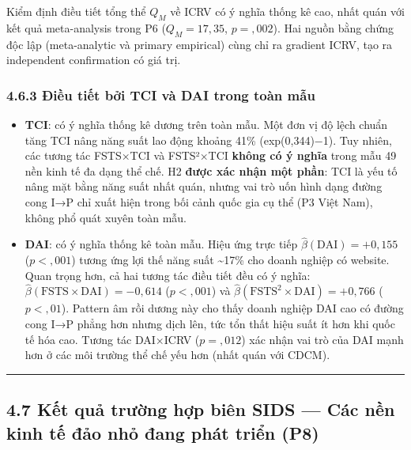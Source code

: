 \documentclass[12pt,a4paper]{article}
\providecommand{\tightlist}{\setlength{\itemsep}{0pt}\setlength{\parskip}{0pt}}
\begin{document}
Kiểm định điều tiết tổng thể \(Q_M\) về ICRV có ý nghĩa thống kê cao,
nhất quán với kết quả meta-analysis trong P6 (\(Q_M = 17{,}35\),
\(p = {,}002\)). Hai nguồn bằng chứng độc lập (meta-analytic và primary
empirical) cùng chỉ ra gradient ICRV, tạo ra independent confirmation có
giá trị.

\hypertarget{463-ux111iux1ec1u-tiux1ebft-bux1edfi-tci-vuxe0-dai-trong-touxe0n-mux1eabu}{%
\subsubsection{4.6.3 Điều tiết bởi TCI và DAI trong toàn
mẫu}\label{463-ux111iux1ec1u-tiux1ebft-bux1edfi-tci-vuxe0-dai-trong-touxe0n-mux1eabu}}

\begin{itemize}
\tightlist
\item
  \textbf{TCI}: có ý nghĩa thống kê dương trên toàn mẫu. Một đơn vị độ
  lệch chuẩn tăng TCI nâng năng suất lao động khoảng 41\%
  (exp(0,344)−1). Tuy nhiên, các tương tác FSTS×TCI và FSTS²×TCI
  \textbf{không có ý nghĩa} trong mẫu 49 nền kinh tế đa dạng thể chế. H2
  \textbf{được xác nhận một phần}: TCI là yếu tố nâng mặt bằng năng suất
  nhất quán, nhưng vai trò uốn hình dạng đường cong I→P chỉ xuất hiện
  trong bối cảnh quốc gia cụ thể (P3 Việt Nam), không phổ quát xuyên
  toàn mẫu.
\item
  \textbf{DAI}: có ý nghĩa thống kê toàn mẫu. Hiệu ứng trực tiếp
  \(\hat{\beta}(\text{DAI}) = +0{,}155\) (\(p < {,}001\)) tương ứng lợi
  thế năng suất \textasciitilde17\% cho doanh nghiệp có website. Quan
  trọng hơn, cả hai tương tác điều tiết đều có ý nghĩa:
  \(\hat{\beta}(\text{FSTS} \times \text{DAI}) = -0{,}614\)
  (\(p < {,}001\)) và
  \(\hat{\beta}(\text{FSTS}^2 \times \text{DAI}) = +0{,}766\)
  (\(p < {,}01\)). Pattern âm rồi dương này cho thấy doanh nghiệp DAI
  cao có đường cong I→P phẳng hơn nhưng dịch lên, tức tổn thất hiệu suất
  ít hơn khi quốc tế hóa cao. Tương tác DAI×ICRV (\(p = {,}012\)) xác
  nhận vai trò của DAI mạnh hơn ở các môi trường thể chế yếu hơn (nhất
  quán với CDCM).
\end{itemize}

\begin{center}\rule{0.5\linewidth}{0.5pt}\end{center}

\hypertarget{47-kux1ebft-quux1ea3-trux1b0ux1eddng-hux1ee3p-biuxean-sids--cuxe1c-nux1ec1n-kinh-tux1ebf-ux111ux1ea3o-nhux1ecf-ux111ang-phuxe1t-triux1ec3n-p8}{%
\subsection{4.7 Kết quả trường hợp biên SIDS --- Các nền kinh tế đảo nhỏ
đang phát triển
(P8)}\label{47-kux1ebft-quux1ea3-trux1b0ux1eddng-hux1ee3p-biuxean-sids--cuxe1c-nux1ec1n-kinh-tux1ebf-ux111ux1ea3o-nhux1ecf-ux111ang-phuxe1t-triux1ec3n-p8}}
\end{document}
